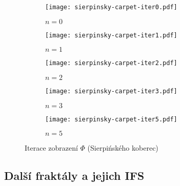 \begin{figure}[H]
    \centering
    \begin{subfigure}{0.45\textwidth}
        \centering
        \texttt{[image: sierpinsky-carpet-iter0.pdf]}
        \begin{center}
            $n=0$
        \end{center}
    \end{subfigure}
    \qquad
    \vspace{1cm}
    \begin{subfigure}{0.45\textwidth}
        \centering
        \texttt{[image: sierpinsky-carpet-iter1.pdf]}
        \begin{center}
            $n=1$
        \end{center}
    \end{subfigure}
    \qquad
    \begin{subfigure}{0.45\textwidth}
        \centering
        \texttt{[image: sierpinsky-carpet-iter2.pdf]}
        \begin{center}
            $n=2$
        \end{center}
    \end{subfigure}
    \qquad
    \vspace{1cm}
    \begin{subfigure}{0.45\textwidth}
        \centering
        \texttt{[image: sierpinsky-carpet-iter3.pdf]}
        \begin{center}
            $n=3$
        \end{center}
    \end{subfigure}
    \qquad
    \begin{subfigure}{0.45\textwidth}
        \centering
        \texttt{[image: sierpinsky-carpet-iter5.pdf]}
        \begin{center}
            $n=5$
        \end{center}
    \end{subfigure}
    \caption{Iterace zobrazení $\Phi$ (Sierpińského koberec)}
    \label{fig:iterace-zobrazeni-fi-sierpinskeho-koberec}
\end{figure}

\subsection{Další fraktály a jejich IFS}\label{subsec:fraktaly-a-jejich-ifs}

